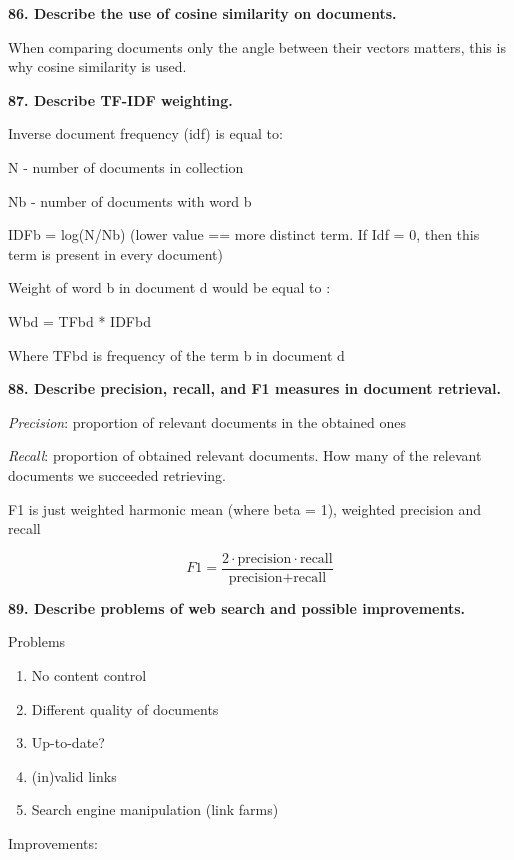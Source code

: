 \textbf{86. Describe the use of cosine similarity on documents.}

When comparing documents only the angle between their vectors matters,
this is why cosine similarity is used.

\textbf{87. Describe TF-IDF weighting.}

Inverse document frequency (idf) is equal to:

N - number of documents in collection

Nb - number of documents with word b

IDFb = log(N/Nb) (lower value == more distinct term. If Idf = 0, then
this term is present in every document)

Weight of word b in document d would be equal to :

Wbd = TFbd * IDFbd

Where TFbd is frequency of the term b in document d

\textbf{88. Describe precision, recall, and F1 measures in document retrieval.}

\textit{Precision}: proportion of relevant documents in the obtained ones

\textit{Recall}: proportion of obtained relevant documents. How many
of the relevant documents we succeeded retrieving.

F1 is just weighted harmonic mean (where beta = 1), weighted precision
and recall

\[ F1 = \frac{2 \cdot \text{precision} \cdot \text{recall} }{\text{precision} + \text{recall}} \]

\textbf{89. Describe problems of web search and possible improvements.}

Problems

\begin{enumerate}
\def\labelenumi{\arabic{enumi}.}
\item No content control
\item Different quality of documents
\item Up-to-date?
\item (in)valid links
\item Search engine manipulation (link farms)
\end{enumerate}

Improvements:

